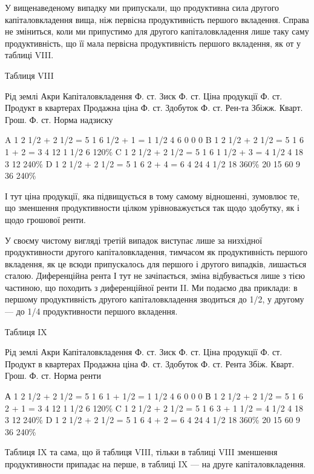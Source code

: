 У вищенаведеному випадку ми припускали, що продуктивна сила другого
капіталовкладення вища, ніж первісна продуктивність першого вкладення. Справа
не зміниться, коли ми припустимо для другого капіталовкладення лише таку саму
продуктивність, що її мала первісна продуктивність першого вкладення, як от у
таблиці VIII.

Таблиця VIII

Рід землі
Акри
Капіталовкладення Ф. ст.
Зиск Ф. ст.
Ціна продукції Ф. ст.
Продукт в квартерах
Продажна ціна Ф. ст.
Здобуток Ф. ст.
Рен-та
Збіжж. Кварт.
Грош. Ф. ст.
Норма надзиску

A    1    2 1/2 + 2 1/2 = 5    1     6      1/2 + 1 = 1 1/2       4      6            0            0
        0
B    1    2 1/2 + 2 1/2 = 5    1     6      1 + 2 = 3                  4    12           1 1/2     
6       120\%
C    1    2 1/2 + 2 1/2 = 5    1     6      1 1/2 + 3 = 4 1/2    4    18            3           12  
    240\%
D    1    2 1/2 + 2 1/2 = 5    1     6      2 + 4 = 6                  4    24            4 1/2   
18       360\%
                                      20                                 15                    60   
       9             36      240\%

І тут ціна продукції, яка підвищується в тому самому відношенні, зумовлює
те, що зменшення продуктивности цілком урівноважується так щодо здобутку,
як і щодо грошової ренти.

У своєму чистому вигляді третій випадок виступає лише за низхідної продуктивности
другого капіталовкладення, тимчасом як продуктивність першого вкладення,
як це всюди припускалось для першого і другого випадків, лишається сталою.
Диференційна рента І тут не зачіпається, зміна відбувається лише з тією частиною,
що походить з диференційної ренти II. Ми подаємо два приклади: в
першому продуктивність другого капіталовкладення зводиться до 1/2, у другому
— до 1/4 продуктивности першого вкладення.

Таблиця IX

Рід землі
Акри
Капіталовкладення Ф. ст.
Зиск Ф. ст.
Ціна продукції Ф. ст.
Продукт в квартерах
Продажна  ціна Ф. ст.
Здобуток Ф. ст.
Рента
Збіж. Кварт.
Грош. Ф. ст.
Норма ренти

А    1    2 1/2 + 2 1/2 = 5       1    6      1 + 1/2 = 1 1/2         4       6           0         
     0            0
В    1    2 1/2 + 2 1/2 = 5       1     6      2 + 1 = 3                   4     12           1 1/2 
      6          120\%
C    1    2 1/2 + 2 1/2 = 5       1     6      3 + 1 1/2 = 4 1/2     4     18            3          
  12          240\%
D    1    2 1/2 + 2 1/2 = 5       1     6      4 + 2 = 6                  4     24             4 1/2
    18          360\%
                                        20                                    15                   
60              9          36          240\%

Таблиця IX та сама, що й таблиця VIII, тільки в таблиці VIII зменшення
продуктивности припадає на перше, в таблиці IX — на друге капіталовкладення.

